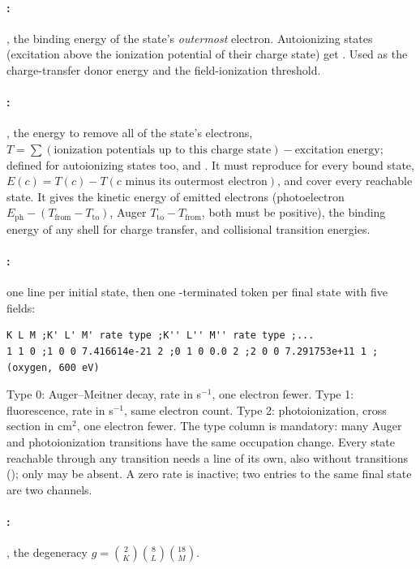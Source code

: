 \paragraph{:} , the binding energy of the state's \emph{outermost}
electron.
Autoionizing states (excitation above the ionization potential of their charge state) get .
Used as the charge-transfer donor energy and the field-ionization threshold.

\paragraph{:} , the energy to remove all of the state's electrons,
$T = \sum(\text{ionization potentials up to this charge state}) - \text{excitation energy}$; defined for autoionizing
states too, and .
It must reproduce  for every bound state, $E(c) = T(c) - T(c\text{ minus its outermost
electron})$, and cover every reachable state.
It gives the kinetic energy of emitted electrons (photoelectron $E_{\mathrm{ph}} - (T_{\mathrm{from}}-T_{\mathrm{to}})$,
Auger $T_{\mathrm{to}} - T_{\mathrm{from}}$, both must be positive), the binding energy of any shell for charge
transfer, and collisional transition energies.

\paragraph{:} one line per initial state, then one \code{;}-terminated token per final
state with five fields:
\begin{lstlisting}
K L M ;K' L' M' rate type ;K'' L'' M'' rate type ;...
1 1 0 ;1 0 0 7.416614e-21 2 ;0 1 0 0.0 2 ;2 0 0 7.291753e+11 1 ;      (oxygen, 600 eV)
\end{lstlisting}
Type 0: Auger--Meitner decay, rate in s$^{-1}$, one electron fewer.
Type 1: fluorescence, rate in s$^{-1}$, same electron count.
Type 2: photoionization, cross section in cm$^2$, one electron fewer.
The type column is mandatory: many Auger and photoionization transitions have the same occupation change.
Every state reachable through any transition needs a line of its own, also without transitions ();
only  may be absent.
A zero rate is inactive; two entries to the same final state are two channels.

\paragraph{:} , the degeneracy $g = \binom{2}{K}\binom{8}{L}\binom{18}{M}$.

